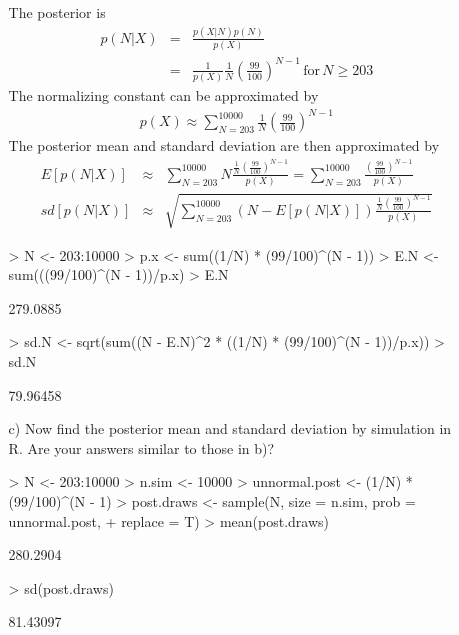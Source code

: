 \documentclass[10pt,a4paper]{article}
\newcommand{\red}{\color{red}}
\newcommand{\black}{\color{black}}
\begin{document}
\begin{enumerate}
\begin{itemize}
\medskip \red 
The posterior is 
\begin{eqnarray*}
p(N|X) &=& \frac{p(X|N)p(N)}{p(X)} \\
&=& \frac{1}{p(X)} \frac{1}{N} \left( \frac{99}{100} \right)^{N-1} \, \mathrm{for} \, N\ge 203
\end{eqnarray*}
The normalizing constant can be approximated by
\begin{eqnarray*}
p(X) \approx \sum_{N=203}^{10000} \frac{1}{N} \left( \frac{99}{100} \right)^{N-1}
\end{eqnarray*}
The posterior mean and standard deviation are then approximated by
\begin{eqnarray*}
E[p(N|X)] &\approx& \sum_{N=203}^{10000} N \frac{\frac{1}{N} \left( \frac{99}{100} \right)^{N-1}}{p(X)} = \sum_{N=203}^{10000} \frac{\left( \frac{99}{100} \right)^{N-1}}{p(X)}\\
sd[p(N|X)] &\approx& \sqrt{\sum_{N=203}^{10000} (N-E[p(N|X)]) \frac{\frac{1}{N} \left( \frac{99}{100} \right)^{N-1}}{p(X)}}
\end{eqnarray*}
\small
\begin{Schunk}
\begin{Sinput}
> N <- 203:10000
> p.x <- sum((1/N) * (99/100)^(N - 1))
> E.N <- sum(((99/100)^(N - 1))/p.x)
> E.N
\end{Sinput}
\begin{Soutput}
[1] 279.0885
\end{Soutput}
\begin{Sinput}
> sd.N <- sqrt(sum((N - E.N)^2 * ((1/N) * (99/100)^(N - 1))/p.x))
> sd.N
\end{Sinput}
\begin{Soutput}
[1] 79.96458
\end{Soutput}
\end{Schunk}
\medskip \black \normalsize

\item[c)] Now find the posterior mean and standard deviation by simulation in R.  Are your answers similar to those in b)?

\medskip \red \small
\begin{Schunk}
\begin{Sinput}
> N <- 203:10000
> n.sim <- 10000
> unnormal.post <- (1/N) * (99/100)^(N - 1)
> post.draws <- sample(N, size = n.sim, prob = unnormal.post, 
+     replace = T)
> mean(post.draws)
\end{Sinput}
\begin{Soutput}
[1] 280.2904
\end{Soutput}
\begin{Sinput}
> sd(post.draws)
\end{Sinput}
\begin{Soutput}
[1] 81.43097
\end{Soutput}
\end{Schunk}
\medskip \black \normalsize
\end{itemize}


\end{enumerate}
\end{document}
